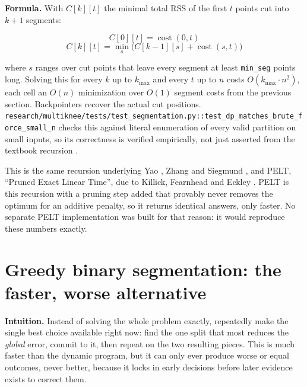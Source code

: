 \documentclass[11pt]{article}
\newcommand{\code}[1]{\texttt{#1}}
\begin{document}
\textbf{Formula.} With $C[k][t]$ the minimal total RSS of the first $t$
points cut into $k+1$ segments:

\begin{equation}
C[0][t] = \operatorname{cost}(0, t)
\end{equation}
\begin{equation}
C[k][t] = \min_{s} \Big( C[k-1][s] + \operatorname{cost}(s, t) \Big)
\end{equation}

where $s$ ranges over cut points that leave every segment at least
\code{min\_seg} points long. Solving this for every $k$ up to $k_{\max}$ and
every $t$ up to $n$ costs $O(k_{\max} \cdot n^2)$, each cell an $O(n)$
minimization over $O(1)$ segment costs from the previous section.
Backpointers recover the actual cut positions.
\code{research/multiknee/tests/test\_segmentation.py::\allowbreak test\_dp\_matches\_brute\_force\_small\_n}
checks this against literal enumeration of every valid partition on small
inputs, so its correctness is verified empirically, not just asserted from
the textbook recursion \citep{cormen2022algorithms,dasgupta2006algorithms}.

This is the same recursion underlying Yao \citeyearpar{yao1988}, Zhang and
Siegmund \citeyearpar{zhangsiegmund2007}, and PELT, ``Pruned Exact Linear
Time'', due to Killick, Fearnhead and Eckley \citeyearpar{killick2012}. PELT
is this recursion with a pruning step added that provably never removes the
optimum for an additive penalty, so it returns identical answers, only
faster. No separate PELT implementation was built for that reason: it would
reproduce these numbers exactly.

\section{Greedy binary segmentation: the faster, worse alternative}

\textbf{Intuition.} Instead of solving the whole problem exactly,
repeatedly make the single best choice available right now: find the one
split that most reduces the \emph{global} error, commit to it, then repeat
on the two resulting pieces. This is much faster than the dynamic program,
but it can only ever produce worse or equal outcomes, never better, because
it locks in early decisions before later evidence exists to correct them.
\end{document}
